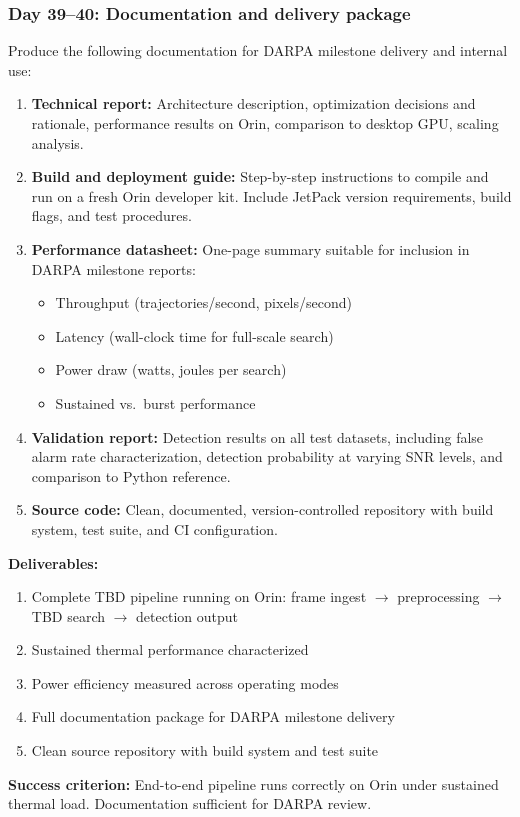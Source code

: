 \documentclass[11pt,letterpaper]{article}
\begin{document}
\subsubsection{Day 39--40: Documentation and delivery package}

Produce the following documentation for DARPA milestone delivery and
internal use:

\begin{enumerate}[leftmargin=2em]
    \item \textbf{Technical report:} Architecture description, optimization
    decisions and rationale, performance results on Orin, comparison to
    desktop GPU, scaling analysis.

    \item \textbf{Build and deployment guide:} Step-by-step instructions
    to compile and run on a fresh Orin developer kit. Include JetPack
    version requirements, build flags, and test procedures.

    \item \textbf{Performance datasheet:} One-page summary suitable for
    inclusion in DARPA milestone reports:
    \begin{itemize}
        \item Throughput (trajectories/second, pixels/second)
        \item Latency (wall-clock time for full-scale search)
        \item Power draw (watts, joules per search)
        \item Sustained vs.\ burst performance
    \end{itemize}

    \item \textbf{Validation report:} Detection results on all test
    datasets, including false alarm rate characterization, detection
    probability at varying SNR levels, and comparison to Python reference.

    \item \textbf{Source code:} Clean, documented, version-controlled
    repository with build system, test suite, and CI configuration.
\end{enumerate}

\begin{milestonebox}
\textbf{Deliverables:}
\begin{enumerate}[leftmargin=2em]
    \item Complete TBD pipeline running on Orin: frame ingest $\to$
    preprocessing $\to$ TBD search $\to$ detection output
    \item Sustained thermal performance characterized
    \item Power efficiency measured across operating modes
    \item Full documentation package for DARPA milestone delivery
    \item Clean source repository with build system and test suite
\end{enumerate}
\textbf{Success criterion:} End-to-end pipeline runs correctly on Orin
under sustained thermal load. Documentation sufficient for DARPA review.
\end{milestonebox}
\end{document}
